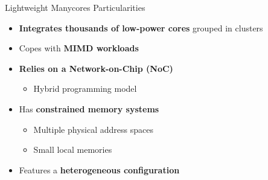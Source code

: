 	\begin{frame}[fragile]{Lightweight Manycores Particularities}
		\begin{itemize}
			\item \textbf{Integrates thousands of low-power cores} grouped in clusters
			\item Copes with \textbf{MIMD workloads}
			\item \textbf{Relies on a Network-on-Chip (NoC)} %
			\begin{itemize}
				\item Hybrid programming model
			\end{itemize}
			\item Has \textbf{constrained memory systems}
			\begin{itemize}
				\item Multiple physical address spaces
				\item Small local memories
			\end{itemize}
			\item Features a \textbf{heterogeneous configuration}
		\end{itemize}


	\end{frame}

